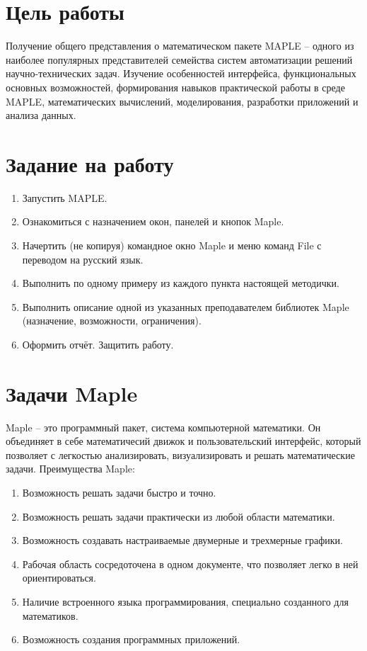\documentclass[a4paper,14pt]{extarticle}
\begin{document}

    \section{Цель работы}
    Получение общего представления о математическом пакете MAPLE -- одного из наиболее
    популярных представителей семейства систем автоматизации решений научно-технических
    задач. Изучение особенностей интерфейса, функциональных основных возможностей,
    формирования навыков практической работы в среде MAPLE, математических вычислений,
    моделирования, разработки приложений и анализа данных.
    
    \section{Задание на работу}
    \begin{enumerate}
        \item Запустить MAPLE.
        \item Ознакомиться с назначением окон, панелей и кнопок  Maple.
        \item Начертить (не копируя) командное окно Maple и меню команд File с 
              переводом на русский язык.
        \item Выполнить по одному примеру из каждого пункта настоящей методички.
        \item Выполнить описание одной из указанных преподавателем библиотек
              Maple (назначение, возможности, ограничения).
        \item Оформить отчёт.  Защитить работу.    
    \end{enumerate}

    \section{Задачи Maple}
    Maple -- это программный пакет, система компьютерной математики. Он объединяет в себе
    математичесий движок и пользовательский интерфейс, который позволяет с легкостью анализировать,
    визуализировать и решать математические задачи. Преимущества Maple:
    \begin{enumerate}
        \item Возможность решать задачи быстро и точно.
        \item Возможность решать задачи практически из любой области математики.
        \item Возможность создавать настраиваемые двумерные и трехмерные графики.
        \item Рабочая область сосредоточена в одном документе, что позволяет легко
              в ней ориентироваться.
        \item Наличие встроенного языка программирования, специально созданного для
              математиков.
        \item Возможность создания программных приложений.
    \end{enumerate}
\end{document}
